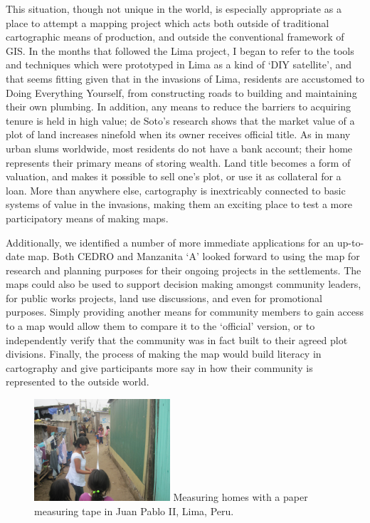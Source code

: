 \documentclass[11pt]{report}
\begin{document}
This situation, though not unique in the world, is especially appropriate as a place to attempt a mapping project which acts both outside of traditional cartographic means of production, and outside the conventional framework of GIS. In the months that followed the Lima project, I began to refer to the tools and techniques which were prototyped in Lima as a kind of `DIY satellite', and that seems fitting given that in the invasions of Lima, residents are accustomed to Doing Everything Yourself, from constructing roads to building and maintaining their own plumbing. In addition, any means to reduce the barriers to acquiring tenure is held in high value; de Soto's research shows that the market value of a plot of land increases ninefold when its owner receives official title. As in many urban slums worldwide, most residents do not have a bank account; their home represents their primary means of storing wealth. Land title becomes a form of valuation, and makes it possible to sell one's plot, or use it as collateral for a loan. More than anywhere else, cartography is inextricably connected to basic systems of value in the invasions, making them an exciting place to test a more participatory means of making maps. 

Additionally, we identified a number of more immediate applications for an up-to-date map. Both CEDRO and Manzanita `A' looked forward to using the map for research and planning purposes for their ongoing projects in the settlements. The maps could also be used to support decision making amongst community leaders, for public works projects, land use discussions, and even for promotional purposes. Simply providing another means for community members to gain access to a map would allow them to compare it to the `official' version, or to independently verify that the community was in fact built to their agreed plot divisions. Finally, the process of making the map would build literacy in cartography and give participants more say in how their community is represented to the outside world.  

\begin{figure}
	\begin{flushright}
		\includegraphics[width=0.45\textwidth]{images/juan-pablo-measuring.jpg}
		Measuring homes with a paper measuring tape in Juan Pablo II, Lima, Peru.
	\end{flushright}
\end{figure}
\end{document}
